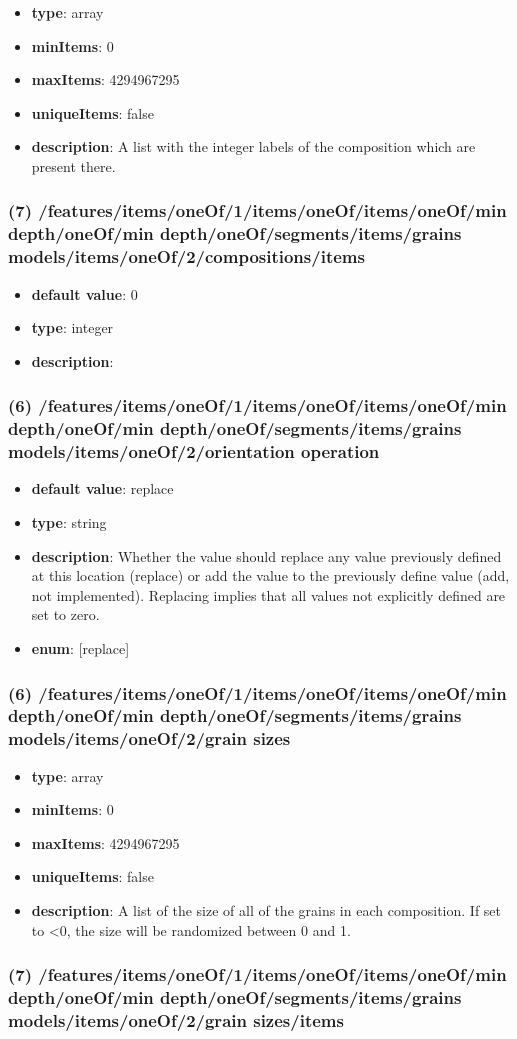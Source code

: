 \begin{itemize}[leftmargin=6em]\item {\bf type}: array
\item {\bf minItems}: 0
\item {\bf maxItems}: 4294967295
\item {\bf uniqueItems}: false
\item {\bf description}: A list with the integer labels of the composition which are present there.
\end{itemize}\subsubsection{(7) /features/items/oneOf/1/items/oneOf/items/oneOf/min depth/oneOf/min depth/oneOf/segments/items/grains models/items/oneOf/2/compositions/items}
\begin{itemize}[leftmargin=7em]\item {\bf default value}: 0
\item {\bf type}: integer
\item {\bf description}: 
\end{itemize}\subsubsection{(6) /features/items/oneOf/1/items/oneOf/items/oneOf/min depth/oneOf/min depth/oneOf/segments/items/grains models/items/oneOf/2/orientation operation}
\begin{itemize}[leftmargin=6em]\item {\bf default value}: replace
\item {\bf type}: string
\item {\bf description}: Whether the value should replace any value previously defined at this location (replace) or add the value to the previously define value (add, not implemented). Replacing implies that all values not explicitly defined are set to zero.
\item {\bf enum}: [replace]\end{itemize}\subsubsection{(6) /features/items/oneOf/1/items/oneOf/items/oneOf/min depth/oneOf/min depth/oneOf/segments/items/grains models/items/oneOf/2/grain sizes}
\begin{itemize}[leftmargin=6em]\item {\bf type}: array
\item {\bf minItems}: 0
\item {\bf maxItems}: 4294967295
\item {\bf uniqueItems}: false
\item {\bf description}: A list of the size of all of the grains in each composition. If set to <0, the size will be randomized between 0 and 1.
\end{itemize}\subsubsection{(7) /features/items/oneOf/1/items/oneOf/items/oneOf/min depth/oneOf/min depth/oneOf/segments/items/grains models/items/oneOf/2/grain sizes/items}
